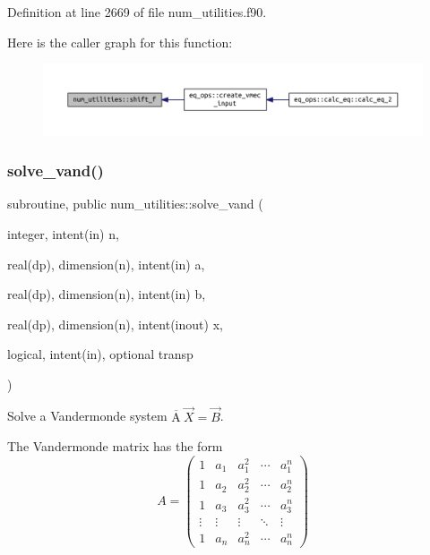 Definition at line 2669 of file num\+\_\+utilities.\+f90.

Here is the caller graph for this function\+:\nopagebreak
\begin{figure}[H]
\begin{center}
\leavevmode
\includegraphics[width=350pt]{namespacenum__utilities_ac887f1cc7176167b352dedbd22ff2a57_icgraph}
\end{center}
\end{figure}
\mbox{\label{namespacenum__utilities_a54c65e345182e2e7e13ac14a0ba3647a}} 
\subsubsection{\texorpdfstring{solve\+\_\+vand()}{solve\_vand()}}
{\footnotesize\ttfamily subroutine, public num\+\_\+utilities\+::solve\+\_\+vand (\begin{DoxyParamCaption}\item[{integer, intent(in)}]{n,  }\item[{real(dp), dimension(n), intent(in)}]{a,  }\item[{real(dp), dimension(n), intent(in)}]{b,  }\item[{real(dp), dimension(n), intent(inout)}]{x,  }\item[{logical, intent(in), optional}]{transp }\end{DoxyParamCaption})}



Solve a Vandermonde system $\overline{\text{A}} \ \vec{X} = \vec{B}$. 

The Vandermonde matrix has the form \[A = \left(\begin{array}{ccccc} 1 & a_1 & a_1^2 & \cdots & a_1^n \\ 1 & a_2 & a_2^2 & \cdots & a_2^n \\ 1 & a_3 & a_3^2 & \cdots & a_3^n \\ \vdots & \vdots & \vdots & \ddots & \vdots \\ 1 & a_n & a_n^2 & \cdots & a_n^n \end{array}\right)\]

